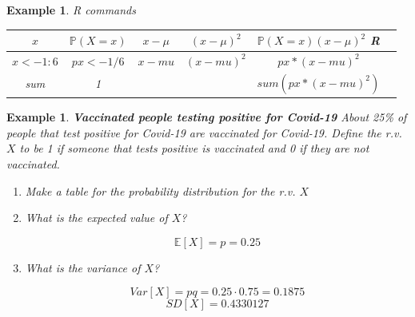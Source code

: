 \documentclass[12pt]{amsart}
\newtheorem{example}[theorem]{Example}
\begin{document}
{\begin{example}
\vspace{1cm}
R commands


\begin{tabular}{| c | c | c | c | c | c |}
  \hline                       
  $x$ & $\mathbb{P}(X=x)$ &  $x - \mu$ & $(x - \mu)^2$ & $\mathbb{P}(X=x)(x - \mu)^2$  R\\
   \hline     
 $x <- 1:6$  & $px <- 1/6$  & $x - mu$ &  $(x - mu)^2$ & $px*(x - mu)^2$\\
   \hline   
   sum & 1 &    &  & $sum(px*(x - mu)^2)$\\
  \hline  
\end{tabular}
\vspace{2cm}


\end{example} 



 \newpage

\begin{example}  \textbf{Vaccinated people testing positive for Covid-19} \newline
About 25\% of people that test positive for Covid-19 are vaccinated for Covid-19.\newline
Define the r.v. $X$ to be 1 if someone that tests positive is vaccinated and 0 if they are not vaccinated.


\begin{enumerate}
\item Make a table for the probability distribution for the r.v. $X$

\vspace{3cm}

\item What is the expected value of $X$?

\vspace{2cm}
\color{blue}
$$\mathbb{E}[X] = p = 0.25$$
\color{black}

\item What is the variance of $X$?

\vspace{2cm}
\color{blue}
$$Var[X] = pq = 0.25\cdot0.75 = 0.1875$$
$$SD[X] = 0.4330127$$

\color{black}
\end{enumerate}



\end{example}}
\end{document}

